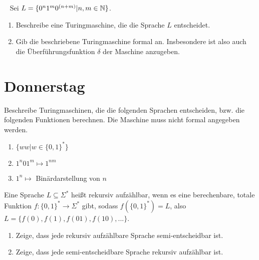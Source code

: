 \documentclass{uebung_cs}
\begin{document}
\begin{aufgabe}\
	Sei $L = \{0^n 1^m 0^{(n+m)} | n,m \in \mathbb{N}\}$.
	\begin{enumerate}
		\item Beschreibe eine Turingmaschine, die die Sprache $L$ entscheidet.
		\item Gib die beschriebene Turingmaschine formal an. Insbesondere ist also auch die Überführungsfunktion $\delta$ der Maschine anzugeben.		
	\end{enumerate}
\end{aufgabe}

\section*{Donnerstag}

\begin{aufgabe}[Turingmaschinen IV]
	Beschreibe Turingmaschinen, die die folgenden Sprachen entscheiden, bzw. die folgenden Funktionen berechnen. Die Maschine muss nicht formal angegeben werden.
	\begin{enumerate}
		\item $\{ww | w \in \{0,1\}^*\}$
		\item $1^n 0 1^m \mapsto 1^{nm}$
		\item $1^n \mapsto$ Binärdarstellung von $n$
	\end{enumerate}
\end{aufgabe}

\begin{aufgabe}
	Eine Sprache $L \subseteq \Sigma^*$ heißt rekursiv aufzählbar, wenn es eine berechenbare, totale Funktion $f \colon \{0,1\}^* \rightarrow \Sigma^*$ gibt, sodass $f(\{0,1\}^*) = L$, also $L = \{f(0), f(1), f(01), f(10), ...\}$.
	\begin{enumerate}
		\item Zeige, dass jede rekursiv aufzählbare Sprache semi-entscheidbar ist.
		\item Zeige, dass jede semi-entscheidbare Sprache rekursiv aufzählbar ist.
	\end{enumerate}
\end{aufgabe}
\end{document}
